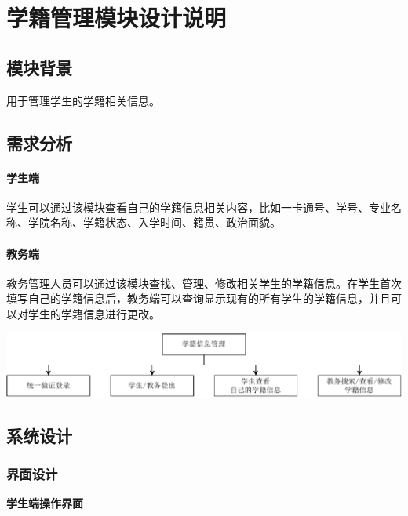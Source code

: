 \documentclass{article}
\begin{document}
\begin{enumerate}
\end{enumerate}

\section{学籍管理模块设计说明}
\subsection{模块背景}
  用于管理学生的学籍相关信息。
\subsection{需求分析}

\paragraph{学生端}
学生可以通过该模块查看自己的学籍信息相关内容，比如一卡通号、学号、专业名称、学院名称、学籍状态、入学时间、籍贯、政治面貌。

\paragraph{教务端}
教务管理人员可以通过该模块查找、管理、修改相关学生的学籍信息。在学生首次填写自己的学籍信息后，教务端可以查询显示现有的所有学生的学籍信息，并且可以对学生的学籍信息进行更改。
\begin{center}
\includegraphics[width=\textwidth]{fig/studentStatus2.pdf}
\end{center}
\subsection{系统设计}
\subsubsection{界面设计}

\begin{center}
\textbf{学生端操作界面}
\end{center}
\end{document}
